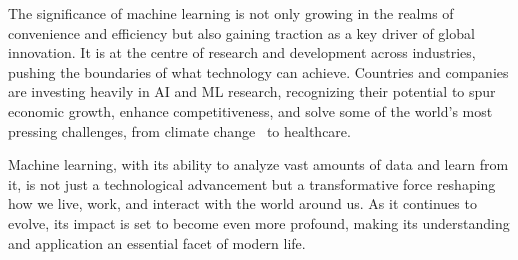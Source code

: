 \documentclass[letterpaper,10pt]{article}
\begin{document}
\par
The significance of machine learning is not only growing in the realms of convenience and efficiency but also gaining traction as a key driver of global innovation. It is at the centre of research and development across industries, pushing the boundaries of what technology can achieve. Countries and companies are investing heavily in AI and ML research, recognizing their potential to spur economic growth, enhance competitiveness, and solve some of the world's most pressing challenges, from climate change~\cite{ClimateChange2022} to healthcare.
\par
Machine learning, with its ability to analyze vast amounts of data and learn from it, is not just a technological advancement but a transformative force reshaping how we live, work, and interact with the world around us. As it continues to evolve, its impact is set to become even more profound, making its understanding and application an essential facet of modern life.
\end{document}
